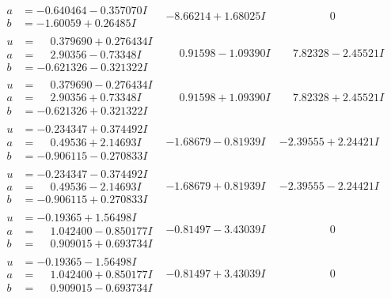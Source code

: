 \documentclass[1p]{elsarticle_modified}
\theoremstyle{definition}
\begin{document}
$$\begin{array}{c|c|c}
\begin{aligned}
a &= -0.640464 - 0.357070 I \\
b &= -1.60059 + 0.26485 I\end{aligned}
 & -8.66214 + 1.68025 I & \phantom{-0.000000 } 0 \\ \hline\begin{aligned}
u &= \phantom{-}0.379690 + 0.276434 I \\
a &= \phantom{-}2.90356 - 0.73348 I \\
b &= -0.621326 - 0.321322 I\end{aligned}
 & \phantom{-}0.91598 - 1.09390 I & \phantom{-}7.82328 - 2.45521 I \\ \hline\begin{aligned}
u &= \phantom{-}0.379690 - 0.276434 I \\
a &= \phantom{-}2.90356 + 0.73348 I \\
b &= -0.621326 + 0.321322 I\end{aligned}
 & \phantom{-}0.91598 + 1.09390 I & \phantom{-}7.82328 + 2.45521 I \\ \hline\begin{aligned}
u &= -0.234347 + 0.374492 I \\
a &= \phantom{-}0.49536 + 2.14693 I \\
b &= -0.906115 - 0.270833 I\end{aligned}
 & -1.68679 - 0.81939 I & -2.39555 + 2.24421 I \\ \hline\begin{aligned}
u &= -0.234347 - 0.374492 I \\
a &= \phantom{-}0.49536 - 2.14693 I \\
b &= -0.906115 + 0.270833 I\end{aligned}
 & -1.68679 + 0.81939 I & -2.39555 - 2.24421 I \\ \hline\begin{aligned}
u &= -0.19365 + 1.56498 I \\
a &= \phantom{-}1.042400 - 0.850177 I \\
b &= \phantom{-}0.909015 + 0.693734 I\end{aligned}
 & -0.81497 - 3.43039 I & \phantom{-0.000000 } 0 \\ \hline\begin{aligned}
u &= -0.19365 - 1.56498 I \\
a &= \phantom{-}1.042400 + 0.850177 I \\
b &= \phantom{-}0.909015 - 0.693734 I\end{aligned}
 & -0.81497 + 3.43039 I & \phantom{-0.000000 } 0 \\ \hline\begin{aligned}

\end{aligned}
\end{array}$$
\end{document}
